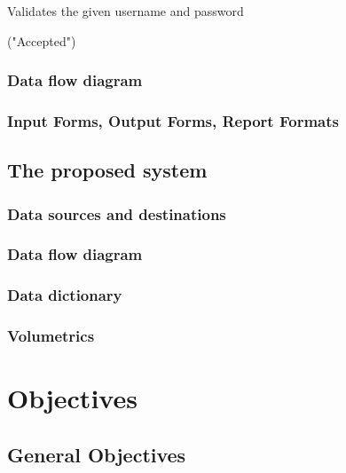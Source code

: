 \begin{algorithm}[H]
\caption{Validates the given username and password}
\begin{algorithmic}[1]
		\SEND("Accepted")
	\Else{}
	\EndIf
\EndWhile
\end{algorithmic}
\end{algorithm}

\subsubsection{Data flow diagram}

\subsubsection{Input Forms, Output Forms, Report Formats}

\subsection{The proposed system}

\subsubsection{Data sources and destinations}

\subsubsection{Data flow diagram}

\subsubsection{Data dictionary}

\subsubsection{Volumetrics}

\section{Objectives}

\subsection{General Objectives}

